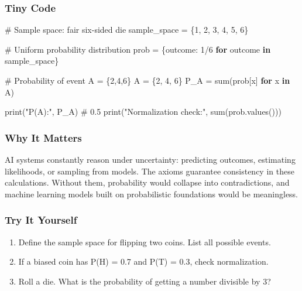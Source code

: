 \documentclass[
  letterpaper,
  DIV=11,
  numbers=noendperiod]{scrreprt}
\newenvironment{Shaded}{\begin{snugshade}}{\end{snugshade}}
\newcommand{\BuiltInTok}[1]{\textcolor[rgb]{0.00,0.23,0.31}{#1}}
\newcommand{\CommentTok}[1]{\textcolor[rgb]{0.37,0.37,0.37}{#1}}
\newcommand{\ControlFlowTok}[1]{\textcolor[rgb]{0.00,0.23,0.31}{\textbf{#1}}}
\newcommand{\DecValTok}[1]{\textcolor[rgb]{0.68,0.00,0.00}{#1}}
\newcommand{\KeywordTok}[1]{\textcolor[rgb]{0.00,0.23,0.31}{\textbf{#1}}}
\newcommand{\NormalTok}[1]{\textcolor[rgb]{0.00,0.23,0.31}{#1}}
\newcommand{\OperatorTok}[1]{\textcolor[rgb]{0.37,0.37,0.37}{#1}}
\newcommand{\StringTok}[1]{\textcolor[rgb]{0.13,0.47,0.30}{#1}}
\providecommand{\tightlist}{%
  \setlength{\itemsep}{0pt}\setlength{\parskip}{0pt}}
\begin{document}
\subsubsection{Tiny Code}\label{tiny-code-120}

\begin{Shaded}
\begin{Highlighting}[]
\CommentTok{\# Sample space: fair six{-}sided die}
\NormalTok{sample\_space }\OperatorTok{=}\NormalTok{ \{}\DecValTok{1}\NormalTok{, }\DecValTok{2}\NormalTok{, }\DecValTok{3}\NormalTok{, }\DecValTok{4}\NormalTok{, }\DecValTok{5}\NormalTok{, }\DecValTok{6}\NormalTok{\}}

\CommentTok{\# Uniform probability distribution}
\NormalTok{prob }\OperatorTok{=}\NormalTok{ \{outcome: }\DecValTok{1}\OperatorTok{/}\DecValTok{6} \ControlFlowTok{for}\NormalTok{ outcome }\KeywordTok{in}\NormalTok{ sample\_space\}}

\CommentTok{\# Probability of event A = \{2,4,6\}}
\NormalTok{A }\OperatorTok{=}\NormalTok{ \{}\DecValTok{2}\NormalTok{, }\DecValTok{4}\NormalTok{, }\DecValTok{6}\NormalTok{\}}
\NormalTok{P\_A }\OperatorTok{=} \BuiltInTok{sum}\NormalTok{(prob[x] }\ControlFlowTok{for}\NormalTok{ x }\KeywordTok{in}\NormalTok{ A)}

\BuiltInTok{print}\NormalTok{(}\StringTok{"P(A):"}\NormalTok{, P\_A)   }\CommentTok{\# 0.5}
\BuiltInTok{print}\NormalTok{(}\StringTok{"Normalization check:"}\NormalTok{, }\BuiltInTok{sum}\NormalTok{(prob.values()))}
\end{Highlighting}
\end{Shaded}

\subsubsection{Why It Matters}\label{why-it-matters-18}

AI systems constantly reason under uncertainty: predicting outcomes,
estimating likelihoods, or sampling from models. The axioms guarantee
consistency in these calculations. Without them, probability would
collapse into contradictions, and machine learning models built on
probabilistic foundations would be meaningless.

\subsubsection{Try It Yourself}\label{try-it-yourself-120}

\begin{enumerate}
\def\labelenumi{\arabic{enumi}.}
\tightlist
\item
  Define the sample space for flipping two coins. List all possible
  events.
\item
  If a biased coin has P(H) = 0.7 and P(T) = 0.3, check normalization.
\item
  Roll a die. What is the probability of getting a number divisible by
  3?
\end{enumerate}
\end{document}
